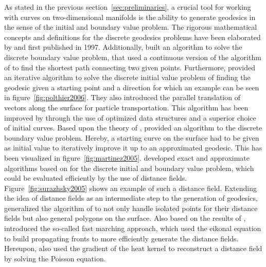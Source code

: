 \documentclass{stdlocal}
\begin{document}
As stated in the previous section~\ref{sec:preliminaries}, a crucial tool for working with curves on two-dimensional manifolds is the ability to generate geodesics in the sense of the initial and boundary value problem.
The rigorous mathematical concepts and definitions for the discrete geodesics problems have been elaborated by \textcite{mitchell1987} and \textcite{polthier2006} first published in 1997.
Additionally, \textcite{mitchell1987} built an algorithm to solve the discrete boundary value problem, that used a continuous version of the algorithm of \textcite{dijkstra1959} to find the shortest path connecting two given points.
Furthermore, \textcite{polthier2006} provided an iterative algorithm to solve the discrete initial value problem of finding the geodesic given a starting point and a direction for which an example can be seen in figure~\ref{fig:polthier2006}.
They also introduced the parallel translation of vectors along the surface for particle transportation.
This algorithm has been improved by \textcite{mancinelli2022} through the use of optimized data structures and a superior choice of initial curves.
Based upon the theory of \textcite{polthier2006}, \textcite{martinez2005} provided an algorithm to the discrete boundary value problem.
Hereby, a starting curve on the surface had to be given as initial value to iteratively improve it up to an approximated geodesic.
This has been visualized in figure~\ref{fig:martinez2005}.
\textcite{surazhsky2005} developed exact and approximate algorithms based on \textcite{mitchell1987} for the discrete initial and boundary value problem, which could be evaluated efficiently by the use of distance fields.
Figure~\ref{fig:surazhsky2005} shows an example of such a distance field.
Extending the idea of distance fields as an intermediate step to the generation of geodesics, \textcite{bommes2007} generalized the algorithm of \textcite{surazhsky2005} to not only handle isolated points for their distance fields but also general polygons on the surface.
Also based on the results of \textcite{mitchell1987}, \textcite{kimmel1996} introduced the so-called fast marching approach, which used the eikonal equation to build propagating fronts to more efficiently generate the distance fields.
Hereupon, \textcite{crane2013} also used the gradient of the heat kernel to reconstruct a distance field by solving the Poisson equation.
\end{document}
